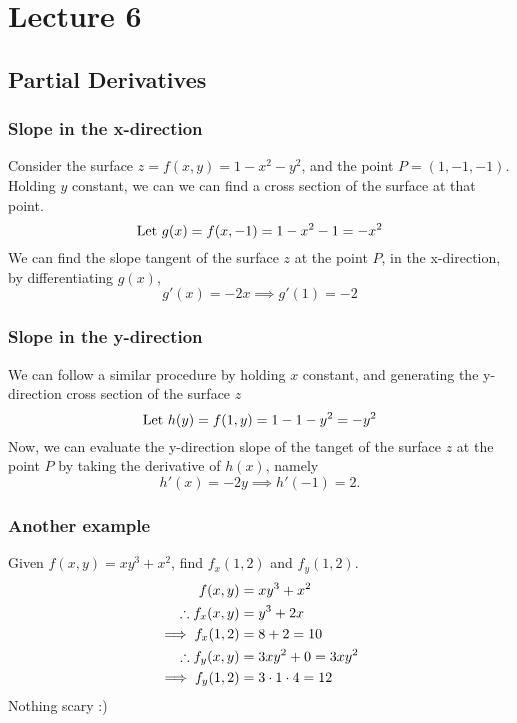 \documentclass{report}
\begin{document}
\section{Lecture 6}
\subsection*{Partial Derivatives}
\subsubsection*{Slope in the x-direction}
Consider the surface $z=f(x,y)=1-x^2-y^2$, and the point $P=(1,-1,-1)$. Holding $y$ constant, we can we can find a cross section of the surface at that point.
$$
	\text{Let } g(x) = f(x,-1)=1-x^2-1 = -x^2
$$
We can find the slope tangent of the surface $z$ at the point $P$, in the x-direction, by differentiating $g(x)$,
$$
	g'(x) = -2x \implies g'(1) = -2
$$

\subsubsection*{Slope in the y-direction}
We can follow a similar procedure by holding $x$ constant, and generating the y-direction cross section of the surface $z$
$$
	\text{Let } h(y) = f(1,y) = 1-1-y^2 = -y^2
$$
Now, we can evaluate the y-direction slope of the tanget of the surface $z$ at the point $P$ by taking the derivative of $h(x)$, namely
$$
	h'(x) = -2y \implies h'(-1) = 2.
$$

\subsubsection*{Another example}
Given $f(x,y)=xy^3 + x^2$, find $f_x(1,2)$ and $f_y(1,2)$.
\begin{gather*}
	\begin{aligned}
		f(x,y) &= xy^3 + x^2 \\
		\therefore f_x(x,y) &= y^3 + 2x \\
		\implies f_x(1,2) &= 8 + 2 = 10 \\
		\therefore f_y(x,y) &= 3xy^2 + 0 = 3xy^2 \\
		\implies f_y(1,2) &= 3\cdot1\cdot4 = 12 
	\end{aligned}
\end{gather*}
Nothing scary :)
\end{document}
